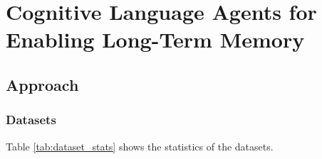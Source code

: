 \cleardoublepage
\chapter{Cognitive Language Agents for Enabling Long-Term Memory}
\label{ch:development}
\label{ch:chapter3}

\section{Approach}
\subsection{Datasets}

Table \ref{tab:dataset_stats} shows the statistics of the datasets.


